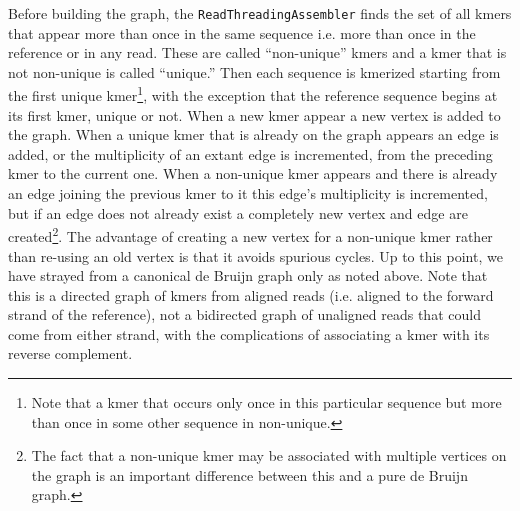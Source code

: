 \documentclass[nofootinbib,amssymb,amsmath]{revtex4}
\newcommand{\code}[1]{\texttt{#1}}
\begin{document}
Before building the graph, the \code{ReadThreadingAssembler} finds the set of all kmers that appear more than once in the same sequence i.e. more than once in the reference or in any read.  These are called ``non-unique'' kmers and a kmer that is not non-unique is called ``unique.''  Then each sequence is kmerized starting from the first unique kmer\footnote{Note that a kmer that occurs only once in this particular sequence but more than once in some other sequence in non-unique.}, with the exception that the reference sequence begins at its first kmer, unique or not.  When a new kmer appear a new vertex is added to the graph.  When a unique kmer that is already on the graph appears an edge is added, or the multiplicity of an extant edge is incremented, from the preceding kmer to the current one.  When a non-unique kmer appears and there is already an edge joining the previous kmer to it this edge's multiplicity is incremented, but if an edge does not already exist a completely new vertex and edge are created\footnote{The fact that a non-unique kmer may be associated with multiple vertices on the graph is an important difference between this and a pure de Bruijn graph.}.  The advantage of creating a new vertex for a non-unique kmer rather than re-using an old vertex is that it avoids spurious cycles.  Up to this point, we have strayed from a canonical de Bruijn graph only as noted above.  Note that this is a directed graph of kmers from aligned reads (i.e. aligned to the forward strand of the reference), not a bidirected graph of unaligned reads that could come from either strand, with the complications of associating a kmer with its reverse complement.
\end{document}
